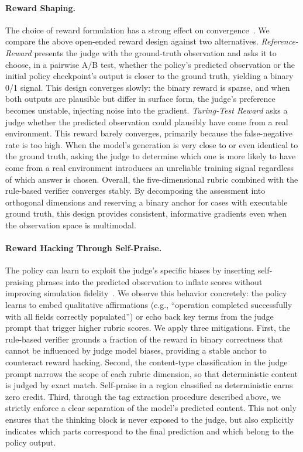 \documentclass{llmxive}
\begin{document}
\paragraph{Reward Shaping.}
The choice of reward formulation has a strong effect on convergence~\citep{zhu2025planner}.
We compare the above open-ended reward design against two alternatives.
\emph{Reference-Reward} presents the judge with the ground-truth observation and asks it to choose, in a pairwise A/B test, whether the policy's predicted observation or the initial policy checkpoint's output is closer to the ground truth, yielding a binary 0/1 signal. This design converges slowly: the binary reward is sparse, and when both outputs are plausible but differ in surface form, the judge's preference becomes unstable, injecting noise into the gradient.
\emph{Turing-Test Reward} asks a judge whether the predicted observation could plausibly have come from a real environment.
This reward barely converges, primarily because the false-negative rate is too high.
When the model's generation is very close to or even identical to the ground truth, asking the judge to determine which one is more likely to have come from a real environment introduces an unreliable training signal regardless of which answer is chosen.
Overall, the five-dimensional rubric combined with the rule-based verifier converges stably.
By decomposing the assessment into orthogonal dimensions and reserving a binary anchor for cases with executable ground truth, this design provides consistent, informative gradients even when the observation space is multimodal.

\paragraph{Reward Hacking Through Self-Praise.}
The policy can learn to exploit the judge's specific biases by inserting self-praising phrases into the predicted observation to inflate scores without improving simulation fidelity~\citep{wang2026reward}.
We observe this behavior concretely: the policy learns to embed qualitative affirmations (e.g., ``operation completed successfully with all fields correctly populated'') or echo back key terms from the judge prompt that trigger higher rubric scores.
We apply three mitigations.
First, the rule-based verifier grounds a fraction of the reward in binary correctness that cannot be influenced by judge model biases, providing a stable anchor to counteract reward hacking.
Second, the content-type classification in the judge prompt narrows the scope of each rubric dimension, so that deterministic content is judged by exact match. Self-praise in a region classified as deterministic earns zero credit.
Third, through the tag extraction procedure described above, we strictly enforce a clear separation of the model’s predicted content.
This not only ensures that the thinking block is never exposed to the judge, but also explicitly indicates which parts correspond to the final prediction and which belong to the policy output.
\end{document}
